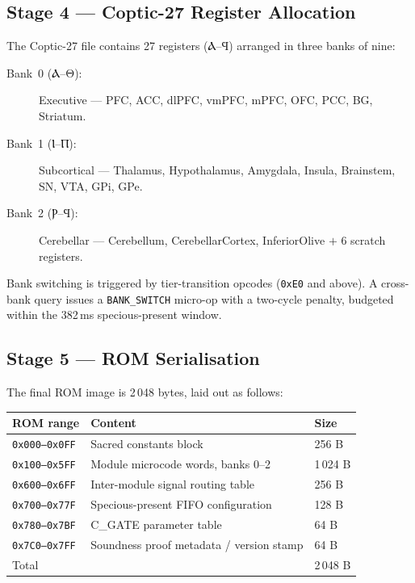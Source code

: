 \subsection{Stage 4 — Coptic-27 Register Allocation}
\label{ssec:flos73-stage4}

The Coptic-27 file contains 27 registers (Ⲁ–Ϥ) arranged in three banks of
nine:
\begin{description}
  \item[Bank~0 (Ⲁ–Θ):] Executive — PFC, ACC, dlPFC, vmPFC, mPFC, OFC, PCC,
    BG, Striatum.
  \item[Bank~1 (Ⲓ–Ⲡ):] Subcortical — Thalamus, Hypothalamus, Amygdala,
    Insula, Brainstem, SN, VTA, GPi, GPe.
  \item[Bank~2 (Ⲣ–Ϥ):] Cerebellar — Cerebellum, CerebellarCortex,
    InferiorOlive $+$ 6 scratch registers.
\end{description}

Bank switching is triggered by tier-transition opcodes (\texttt{0xE0} and
above).  A cross-bank query issues a \texttt{BANK\_SWITCH} micro-op with a
two-cycle penalty, budgeted within the 382\,ms specious-present window.

\subsection{Stage 5 — ROM Serialisation}
\label{ssec:flos73-stage5}

The final ROM image is 2\,048 bytes, laid out as follows:

\begin{center}
\begin{tabular}{lll}
\toprule
ROM range & Content & Size \\
\midrule
\texttt{0x000–0x0FF} & Sacred constants block         & 256 B \\
\texttt{0x100–0x5FF} & Module microcode words, banks 0–2 & 1\,024 B \\
\texttt{0x600–0x6FF} & Inter-module signal routing table & 256 B \\
\texttt{0x700–0x77F} & Specious-present FIFO configuration & 128 B \\
\texttt{0x780–0x7BF} & C\_GATE parameter table         & 64 B \\
\texttt{0x7C0–0x7FF} & Soundness proof metadata / version stamp & 64 B \\
\midrule
Total & & 2\,048 B \\
\bottomrule
\end{tabular}
\end{center}


